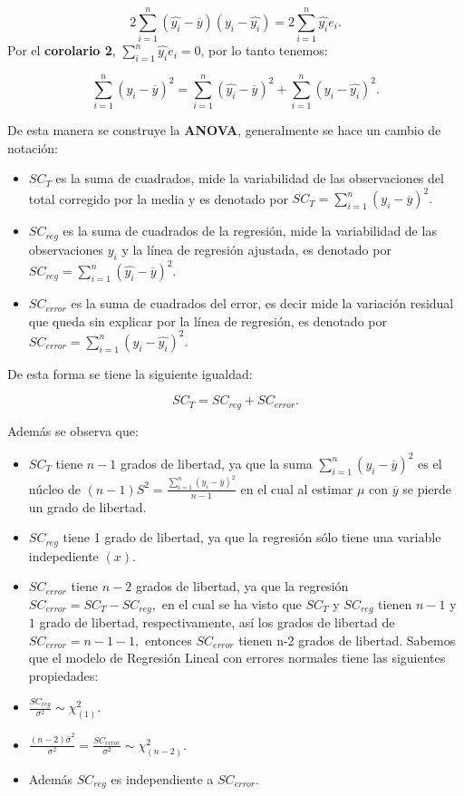 \documentclass[
  a4paper,
  oneside,
  openany]{book}
\begin{document}
\[2\sum_{i=1}^{n}(\hat{y_{i}}-\overline{y})(y_{i}-\hat{y_{i}})=2\sum_{i=1}^{n}\hat{y_{i}}e_{i}.\]
Por el \textbf{corolario 2}, \(\sum_{i=1}^{n}\hat{y_{i}}e_{i}=0\), por lo tanto tenemos:

\[\sum_{i=1}^{n}(y_{i}-\overline{y})^2=\sum_{i=1}^{n}(\hat{y_{i}}-\overline{y})^2+\sum_{i=1}^{n}(y_{i}-\hat{y_{i}})^2.\]

De esta manera se construye la \textbf{ANOVA}, generalmente se hace un cambio de notación:

\begin{itemize}
\item
  \(SC_{T}\) es la suma de cuadrados, mide la variabilidad de las observaciones del total corregido por la media y es denotado por \(SC_{T}=\sum_{i=1}^{n}(y_{i}-\overline{y})^2.\)
\item
  \(SC_{reg}\) es la suma de cuadrados de la regresión, mide la variabilidad de las observaciones \(y_{i}\) y la línea de regresión ajustada, es denotado por \(SC_{reg}=\sum_{i=1}^{n}(\hat{y_{i}}-\overline{y})^2.\)
\item
  \(SC_{error}\) es la suma de cuadrados del error, es decir mide la variación residual que queda sin explicar por la línea de regresión, es denotado por \(SC_{error}=\sum_{i=1}^{n}(y_{i}-\hat{y_{i}})^2.\)
\end{itemize}

De esta forma se tiene la siguiente igualdad:

\[SC_{T}=SC_{reg}+SC_{error}.\]

Además se observa que:

\begin{itemize}
\item
  \(SC_{T}\) tiene \(n-1\) grados de libertad, ya que la suma \(\sum_{i=1}^{n}(y_{i}-\overline{y})^2\) es el núcleo de \((n-1)S^2=\frac{\sum_{i=1}^{n}(y_{i}-\overline{y})^2}{n-1}\) en el cual al estimar \(\mu\) con \(\overline{y}\) se pierde un grado de libertad.
\item
  \(SC_{reg}\) tiene 1 grado de libertad, ya que la regresión sólo tiene una variable indepediente \((x).\)
\item
  \(SC_{error}\) tiene \(n-2\) grados de libertad, ya que la regresión \(SC_{error}=SC_{T}-SC_{reg},\) en el cual se ha visto que \(SC_{T}\) y \(SC_{reg}\) tienen \(n-1\) y \(1\) grado de libertad, respectivamente, así los grados de libertad de \(SC_{error}=n-1-1,\) entonces \(SC_{error}\) tienen n-2 grados de libertad.
  Sabemos que el modelo de Regresión Lineal con errores normales tiene las siguientes propiedades:
\item
  \(\frac{SC_{reg}}{\sigma^2}\sim \chi^2_{(1)}.\)
\item
  \(\frac{(n-2)\hat{\sigma}^2}{\sigma^2}=\frac{SC_{error}}{\sigma^2}\sim\chi^2_{(n-2)}.\)
\item
  Además \(SC_{reg}\) es independiente a \(SC_{error}.\)
\end{itemize}
\end{document}

